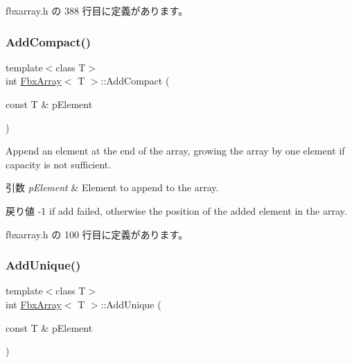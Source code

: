  fbxarray.\+h の 388 行目に定義があります。

\mbox{\label{class_fbx_array_a7d59d8f9f24a1cc2092aac057bb12213}} 
\subsubsection{\texorpdfstring{Add\+Compact()}{AddCompact()}}
{\footnotesize\ttfamily template$<$class T$>$ \\
int \hyperlink{class_fbx_array}{Fbx\+Array}$<$ T $>$\+::Add\+Compact (\begin{DoxyParamCaption}\item[{const T \&}]{p\+Element }\end{DoxyParamCaption})\hspace{0.3cm}{\ttfamily [inline]}}

Append an element at the end of the array, growing the array by one element if capacity is not sufficient. 
\begin{DoxyParams}{引数}
{\em p\+Element} & Element to append to the array. \\
\hline
\end{DoxyParams}
\begin{DoxyReturn}{戻り値}
-\/1 if add failed, otherwise the position of the added element in the array. 
\end{DoxyReturn}


 fbxarray.\+h の 100 行目に定義があります。

\mbox{\label{class_fbx_array_a30f56716ede895f07b7b6ed59a889623}} 
\subsubsection{\texorpdfstring{Add\+Unique()}{AddUnique()}}
{\footnotesize\ttfamily template$<$class T$>$ \\
int \hyperlink{class_fbx_array}{Fbx\+Array}$<$ T $>$\+::Add\+Unique (\begin{DoxyParamCaption}\item[{const T \&}]{p\+Element }\end{DoxyParamCaption})\hspace{0.3cm}{\ttfamily [inline]}}

